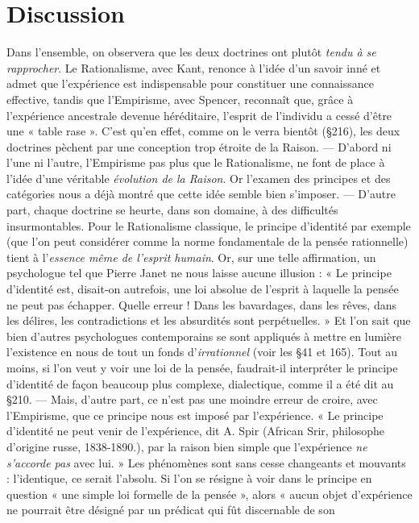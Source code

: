 \section{Discussion}%
Dans l’ensemble, on observera que les deux
doctrines ont plutôt {\it tendu à se rapprocher}. Le Rationalisme, avec
Kant, renonce à l’idée d’un
savoir inné et admet que l’expérience est indispensable pour
constituer une connaissance
effective, tandis que l’Empirisme, avec Spencer, reconnaît
que, grâce à l’expérience ancestrale devenue héréditaire, l’esprit de l’individu a cessé d’être
une « table rase ». C’est qu’en effet, comme on le verra bientôt
(\S 216), les deux doctrines pèchent par une conception trop
étroite de la Raison. — D'abord ni l’une ni l’autre, l’Empirisme
pas plus que le Rationalisme, ne font de place à l’idée d’une
véritable {\it évolution de la Raison}. Or l’examen des principes et des
catégories nous a déjà montré
que cette idée semble bien s’imposer. — D'autre part, chaque
doctrine se heurte, dans son
domaine, à des difficultés insurmontables. Pour le Rationalisme
classique, le principe d'identité
par exemple (que l’on peut considérer comme la norme fondamentale de la pensée rationnelle)
tient à l'{\it essence même de l'esprit
humain}. Or, sur une telle affirmation, un psychologue tel que
Pierre Janet ne nous laisse aucune illusion : « Le principe
d'identité est, disait-on autrefois, une loi absolue de l'esprit
à laquelle la pensée ne peut pas
échapper. Quelle erreur ! Dans les bavardages, dans les rêves, dans les
délires, les contradictions et les absurdités sont perpétuelles. » Et l’on
sait que bien d’autres psychologues contemporains se sont appliqués
à mettre en lumière l’existence en nous de tout un fonds d’{\it irrationnel}
(voir les \S 41 et 165). Tout au moins, si l’on veut y voir une loi de
la pensée, faudrait-il interpréter le principe d'identité de façon beaucoup plus complexe, dialectique, comme il a été dit au \S 210. — Mais,
d’autre part, ce n’est pas une moindre erreur de croire, avec l’Empirisme, que ce principe nous est imposé par l'expérience. « Le principe
d'identité ne peut venir de l'expérience, dit A. Spir {\scriptsize (African Srir, philosophe d'origine russe, 1838-1890.)}, par la raison
bien simple que l’expérience {\it ne s'accorde pas} avec lui. » Les phénomènes sont sans cesse changeants et mouvants : l’identique, ce serait
l'absolu. Si l’on se résigne à voir dans le principe en question « une
simple loi formelle de la pensée », alors « aucun objet d’expérience
ne pourrait être désigné par un prédicat qui fût discernable de son
